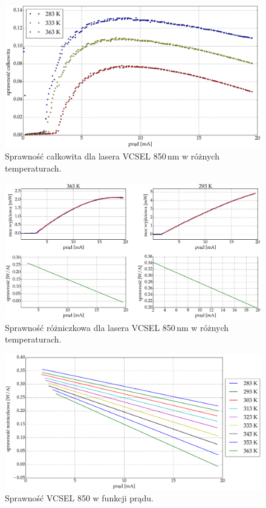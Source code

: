 \begin{figure}
\center
  \includegraphics[scale=0.30]{plot_vcsel_850/plot_eff_wall.eps}
  \caption{Sprawność całkowita dla lasera VCSEL 850\,nm w różnych temperaturach.}
  \label{vcsel_850_rys_8}
\end{figure}
\begin{figure}
\center
  \includegraphics[scale=0.30]{plot_vcsel_850/plot_eff_all_via_current2.eps}
  \caption{Sprawność różniczkowa dla lasera VCSEL 850\,nm w różnych temperaturach.}
  \label{vcsel_850_rys_9}
\end{figure}
\begin{figure}
\center
  \includegraphics[scale=0.30]{plot_vcsel_850/plot_eff_all_via_current.eps}
  \caption{Sprawność VCSEL 850 w funkcji prądu.}
  \label{vcsel_850_rys_3}
\end{figure}
\newpage
